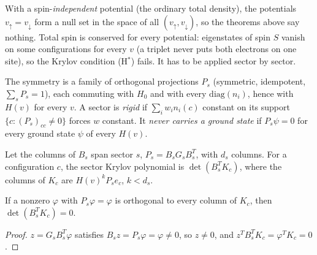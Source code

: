 With a spin-\emph{independent} potential (the ordinary total density), the potentials $v_\uparrow=v_\downarrow$
form a null set in the space of all $(v_\uparrow,v_\downarrow)$, so the theorems above say nothing. Total spin is
conserved for every potential: eigenstates of spin $S$ vanish on some configurations for every $v$ (a
triplet never puts both electrons on one site), so the Krylov condition (H$^*$) fails. It has to be
applied sector by sector.

\begin{definition}[Sectors]
  \label{def:RigidOn}
  \leanok
  The symmetry is a family of orthogonal projections $P_s$ (symmetric, idempotent, $\sum_sP_s=1$), each
  commuting with $H_0$ and with every $\mathrm{diag}(n_i)$, hence with $H(v)$ for every $v$. A sector is
  \emph{rigid} if $\sum_iw_in_i(c)$ constant on its support $\{c:(P_s)_{cc}\ne0\}$ forces $w$ constant. It
  \emph{never carries a ground state} if $P_s\psi=0$ for every ground state $\psi$ of every $H(v)$.
\end{definition}

\begin{definition}
  \label{def:symKrylovPoly}
  \leanok
  Let the columns of $B_s$ span sector $s$, $P_s=B_sG_sB_s^T$, with $d_s$ columns. For a configuration $c$, the
  sector Krylov polynomial is $\det(B_s^TK_c)$, where the columns of $K_c$ are $H(v)^kP_se_c$, $k<d_s$.
\end{definition}

\begin{lemma}
  \label{lem:det_symKry_eq_zero}
  \leanok
  If a nonzero $\varphi$ with $P_s\varphi=\varphi$ is orthogonal to every column of $K_c$, then
  $\det(B_s^TK_c)=0$.
\end{lemma}
\begin{proof}
  \leanok
  $z=G_sB_s^T\varphi$ satisfies $B_sz=P_s\varphi=\varphi\ne0$, so $z\ne0$, and
  $z^TB_s^TK_c=\varphi^TK_c=0$.
\end{proof}

